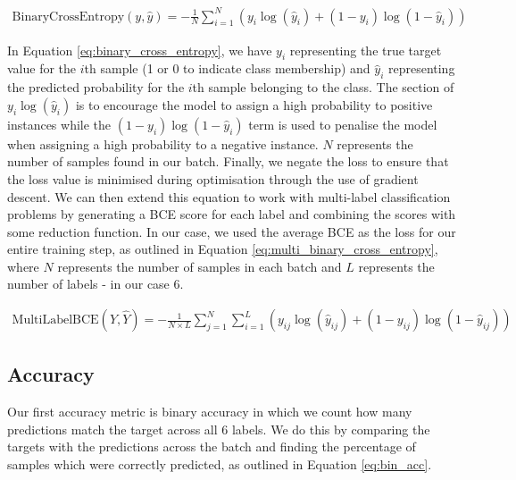 \begin{equation}
    \begin{gathered}
        \text{BinaryCrossEntropy}(y, \hat{y}) = -\frac{1}{N} \sum_{i=1}^{N} \left( y_i \log(\hat{y}_i) + (1-y_i) \log(1-\hat{y}_i) \right)
    \end{gathered}
    \label{eq:binary_cross_entropy}
\end{equation}

In Equation \ref{eq:binary_cross_entropy}, we have $y_i$ representing the true target value for the $i$th sample (1 or 0 to indicate class membership) and $\hat{y}_i$ representing the predicted probability for the $i$th sample belonging to the class. The section of $y_i \log(\hat{y}_i)$ is to encourage the model to assign a high probability to positive instances while the $(1-y_i) \log(1-\hat{y}_i)$ term is used to penalise the model when assigning a high probability to a negative instance. $N$ represents the number of samples found in our batch. Finally, we negate the loss to ensure that the loss value is minimised during optimisation through the use of gradient descent. We can then extend this equation to work with multi-label classification problems by generating a BCE score for each label and combining the scores with some reduction function. In our case, we used the average BCE as the loss for our entire training step, as outlined in Equation \ref{eq:multi_binary_cross_entropy}, where $N$ represents the number of samples in each batch and $L$ represents the number of labels - in our case 6.

\begin{equation}
    \begin{gathered}
        \text{MultiLabelBCE}(Y, \hat{Y}) = -\frac{1}{N \times L} \sum_{j=1}^{N} \sum_{i=1}^{L} \left( y_{ij} \log(\hat{y}_{ij}) + (1-y_{ij}) \log(1-\hat{y}_{ij}) \right)
    \end{gathered}
    \label{eq:multi_binary_cross_entropy}
\end{equation}

\subsection{Accuracy}

Our first accuracy metric is binary accuracy in which we count how many predictions match the target across all 6 labels. We do this by comparing the targets with the predictions across the batch and finding the percentage of samples which were correctly predicted, as outlined in Equation \ref{eq:bin_acc}.

